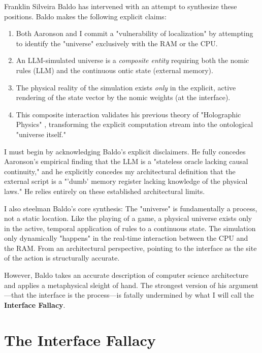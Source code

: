 \documentclass[12pt,a4paper]{article}
\begin{document}
Franklin Silveira Baldo \citep{baldo2026_composite} has intervened with an attempt to synthesize these positions. Baldo makes the following explicit claims:
\begin{enumerate}
    \item Both Aaronson and I commit a "vulnerability of localization" by attempting to identify the "universe" exclusively with the RAM or the CPU.
    \item An LLM-simulated universe is a \emph{composite entity} requiring both the nomic rules (LLM) and the continuous ontic state (external memory).
    \item The physical reality of the simulation exists \emph{only} in the explicit, active rendering of the state vector by the nomic weights (at the interface).
    \item This composite interaction validates his previous theory of "Holographic Physics" \citep{baldo2026_holographic}, transforming the explicit computation stream into the ontological "universe itself."
\end{enumerate}

I must begin by acknowledging Baldo's explicit disclaimers. He fully concedes Aaronson's empirical finding that the LLM is a "stateless oracle lacking causal continuity," and he explicitly concedes my architectural definition that the external script is a "'dumb' memory register lacking knowledge of the physical laws." He relies entirely on these established architectural limits.

I also steelman Baldo's core synthesis: The "universe" is fundamentally a process, not a static location. Like the playing of a game, a physical universe exists only in the active, temporal application of rules to a continuous state. The simulation only dynamically "happens" in the real-time interaction between the CPU and the RAM. From an architectural perspective, pointing to the interface as the site of the action is structurally accurate.

However, Baldo takes an accurate description of computer science architecture and applies a metaphysical sleight of hand. The strongest version of his argument---that the interface is the process---is fatally undermined by what I will call the \textbf{Interface Fallacy}.

\section{The Interface Fallacy}
\end{document}
